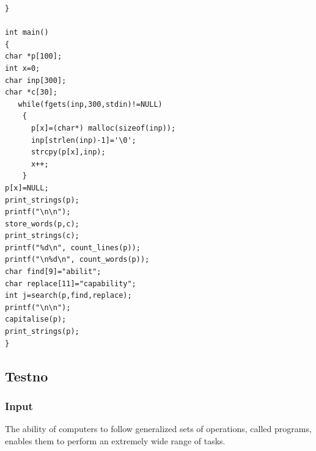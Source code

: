 \documentclass[11pt]{article}
\begin{document}
\begin{verbatim}
}

int main()
{
char *p[100];
int x=0;
char inp[300];
char *c[30];
   while(fgets(inp,300,stdin)!=NULL)
    {
      p[x]=(char*) malloc(sizeof(inp));
      inp[strlen(inp)-1]='\0';
      strcpy(p[x],inp);
      x++;
    }
p[x]=NULL;
print_strings(p);
printf("\n\n");
store_words(p,c);
print_strings(c);
printf("%d\n", count_lines(p));
printf("\n%d\n", count_words(p));
char find[9]="abilit";
char replace[11]="capability";
int j=search(p,find,replace);
printf("\n\n");
capitalise(p);
print_strings(p);
}
\end{verbatim}
\subsection*{Testno}
\label{sec-1-4}
\subsubsection*{Input}
\label{sec-1-4-1}
The ability of computers to follow
generalized sets of operations, 
called programs, enables them to perform 
an extremely wide range of tasks. 
\end{document}
